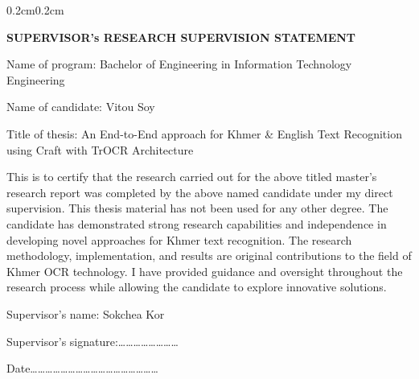 
\begin{adjustwidth}{0.2cm}{0.2cm}


    \begin{center}
        {\englishfont\fontsize{14pt}{21pt}\selectfont \textbf{SUPERVISOR's RESEARCH SUPERVISION STATEMENT} \par}
    \end{center}

    \vspace{-0.3cm}
    \setlength{\parindent}{0pt}
    \vspace{0.3cm}


    \label{supervisor-statement}

    \vspace{0.5cm}
    
    \englishfont\large
    \begin{flushleft}
    Name of program: Bachelor of Engineering in Information Technology Engineering\par
    Name of candidate: Vitou Soy\par
    \end{flushleft}

    \vspace{0cm}
    
    \englishfont\large
    \begin{flushleft}
    Title of thesis: An End-to-End approach for Khmer \& English Text Recognition using Craft with TrOCR Architecture\par
    \end{flushleft}

    \vspace{0.4cm}
    \setlength{\parindent}{0pt}
    This is to certify that the research carried out for the above titled master's
    research report was completed by the above named candidate under my direct
    supervision. This thesis material has not been used for any other degree. The
    candidate has demonstrated strong research capabilities and independence in
    developing novel approaches for Khmer text recognition. The research
    methodology, implementation, and results are original contributions to the field
    of Khmer OCR technology. I have provided guidance and oversight throughout
    the research process while allowing the candidate to explore innovative
    solutions.\par

    \vspace{0.6cm}
    \begin{flushleft}
    Supervisor's name: Sokchea Kor\par
    \vspace{0.1cm}
    Supervisor's signature:……………………\par
    \vspace{0.1cm}
    Date……………………………………………\par
    \end{flushleft}

\end{adjustwidth}